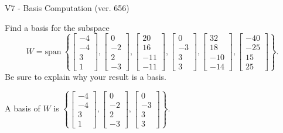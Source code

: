 \begin{exercise}
  \begin{exerciseTitle}V7 - Basis Computation (ver. 656)\end{exerciseTitle}
  \begin{exerciseStatement}
    Find a basis for the subspace 
\[W=\mathrm{span}\ \left\{\left[\begin{array}{r}
-4 \\
-4 \\
3 \\
1
\end{array}\right] , \left[\begin{array}{r}
0 \\
-2 \\
2 \\
-3
\end{array}\right] , \left[\begin{array}{r}
20 \\
16 \\
-11 \\
-11
\end{array}\right] , \left[\begin{array}{r}
0 \\
-3 \\
3 \\
3
\end{array}\right] , \left[\begin{array}{r}
32 \\
18 \\
-10 \\
-14
\end{array}\right] , \left[\begin{array}{r}
-40 \\
-25 \\
15 \\
25
\end{array}\right]\right\}.\]
 Be sure to explain why your result is a basis.


  \end{exerciseStatement}
  \begin{exerciseAnswer}
   A basis of \(W\) is  \(\left\{\left[\begin{array}{r}
-4 \\
-4 \\
3 \\
1
\end{array}\right] , \left[\begin{array}{r}
0 \\
-2 \\
2 \\
-3
\end{array}\right] , \left[\begin{array}{r}
0 \\
-3 \\
3 \\
3
\end{array}\right]\right\}\).
  


  \end{exerciseAnswer}
\end{exercise}